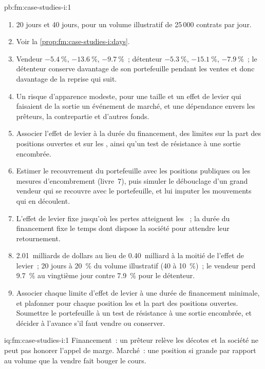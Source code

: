 \begin{solution}{pb:fm:case-studies-i:1}
\begin{enumerate}
sur les années précédentes, que la moitié de l'effet de levier aurait réduit de moitié.
\item 20 jours et 40 jours, pour un volume illustratif de 25\,000 contrats par jour.
\item Voir la \cref{prop:fm:case-studies-i:days}.
\item Vendeur $-5.4~\%$, $-13.6~\%$, $-9.7~\%$~; détenteur $-5.3~\%$, $-15.1~\%$, $-7.9~\%$~; le détenteur conserve davantage de son portefeuille pendant les ventes et donc davantage de la
reprise qui suit.
\item Un risque d'apparence modeste, pour une taille et un effet de levier qui faisaient de la sortie un événement de marché, et une dépendance envers les prêteurs, la contrepartie et d'autres fonds.
\item Associer l'effet de levier à la durée du financement, des limites sur la part des positions ouvertes et sur les , ainsi qu'un test de résistance à une sortie encombrée.
\item Estimer le recouvrement du portefeuille avec les positions publiques ou les mesures d'encombrement (livre~7), puis simuler le débouclage d'un grand vendeur qui se recouvre
avec le portefeuille, et lui imputer les mouvements qui en découlent.
\item L'effet de levier fixe jusqu'où les pertes atteignent les ~; la durée du financement fixe le temps dont dispose la société pour attendre leur retournement.
\item 2.01~milliards de dollars au lieu de 0.40~milliard à la moitié de l'effet de levier~; 20 jours à 20~\% du volume illustratif (40 à 10~\%)~; le vendeur perd 9.7~\% au vingtième jour
contre 7.9~\% pour le détenteur.
\item Associer chaque limite d'effet de levier à une durée de financement minimale, et plafonner pour chaque position les  et la part des positions ouvertes. Soumettre le portefeuille à un test de résistance
à une sortie encombrée, et décider à l'avance s'il faut vendre ou conserver.
\end{enumerate}
\end{solution}

\begin{solution}{iq:fm:case-studies-i:1}
Financement~: un prêteur relève les décotes et la société ne peut pas honorer l'appel de marge. Marché~: une position si grande par rapport au volume que la vendre fait bouger le cours.
\end{solution}

